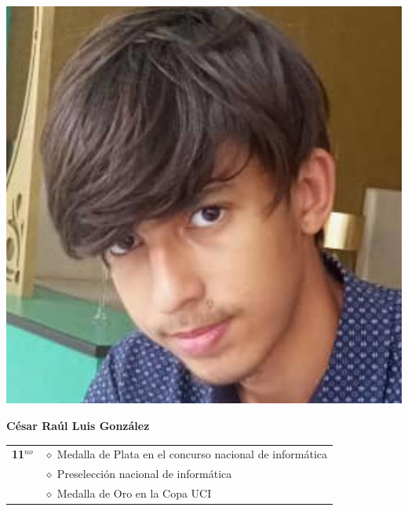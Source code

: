 \vspace*{0.2in}

\begin{minipage}{0.2\textwidth}
	\includegraphics[width=\linewidth]{img/concursantes/cesar.png} %
\end{minipage}
\hfill
\begin{minipage}{0.7\textwidth}
	\textbf{César Raúl Luis González}
	
	\vspace*{0.1in}
	\begin{tabular}{rl}
		
		
		
		\textbf{11$^{no}$} & $\diamond$ Medalla de Plata en el concurso nacional de informática \\
		                   & $\diamond$ Preselección nacional de informática  \\
		                   & $\diamond$ Medalla de Oro en la Copa UCI  \\
		
	\end{tabular}
\end{minipage}

\pagebreak

